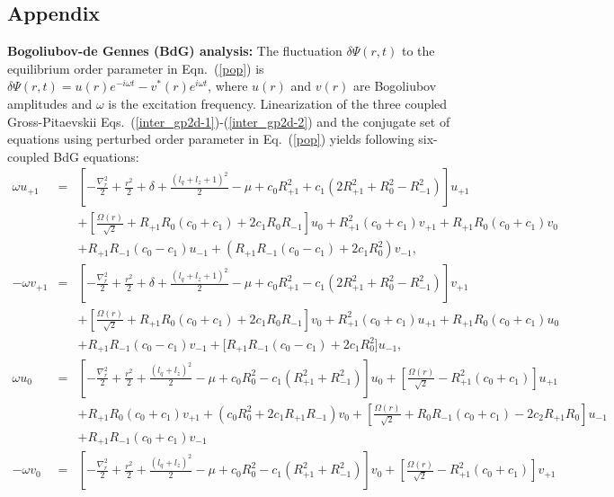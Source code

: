 \documentclass[pra,twocolumn,aps,superscriptaddress,showpacs,longbibliography]{revtex4-1}
\begin{document}
\begin{widetext}
\section*{Appendix}
{\bf Bogoliubov-de Gennes (BdG) analysis:}
The fluctuation $\delta {\Psi(r,t)}$ to the equilibrium order parameter in Eqn.~(\ref{pop}) is 
$\delta {\Psi}(r,t) = u(r) e^{-i\omega t}-v^*(r) e^{i\omega t}$, where $u(r)$ and $v(r)$ are
Bogoliubov amplitudes and $\omega$ is the excitation frequency. Linearization of the three coupled Gross-Pitaevskii 
Eqs.~(\ref{inter_gp2d-1})-(\ref{inter_gp2d-2}) and the conjugate set of equations using perturbed order parameter 
in Eq.~(\ref{pop}) yields following six-coupled BdG equations:
 \begin{subequations}
 \begin{eqnarray}
\omega u_{+1}   &=&
 \left[-\frac{\nabla^2_r}{2} +\frac{r^2}{2}+ \delta+ \frac{(l_q+l_z+1)^2}{2}-\mu +c_0 R_{+1}^2+  c_1(2R_{+1}^2+R_0^2-R_{-1}^2)\right]u_{+1} \nonumber \\
&&
 +\left[\frac{\Omega(r)}{\sqrt{2}}+R_{+1} R_0(c_0+c_1) +2 c_1 R_0 R_{-1}\right]u_0 + R_{+1}^2 (c_0+c_1)v_{+1} + R_{+1} R_0(c_0+c_1) v_0\nonumber \\
&& 
 + R_{+1} R_{-1}(c_0-c_1)u_{-1} +(R_{+1} R_{-1} (c_0-c_1)+2c_1R_0^2)v_{-1}, 
\label{bdg-1u}\\
-\omega v_{+1}   &=&
 \left[-\frac{\nabla^2_r}{2} +\frac{r^2}{2}+ \delta+ \frac{(l_q+l_z+1)^2}{2}-\mu +c_0 R_{+1}^2-  c_1(2R_{+1}^2+R_0^2-R_{-1}^2)\right]v_{+1}\nonumber\\ && + \left[\frac{\Omega(r)}{\sqrt{2}}+R_{+1} R_0(c_0+c_1)
 +2 c_1 R_0 R_{-1}\right]v_0 + R_{+1}^2 (c_0+c_1)u_{+1} + R_{+1} R_0(c_0+c_1) u_0
\nonumber\\ &&
+ R_{+1} R_{-1}(c_0-c_1)v_{-1} +\big[R_{+1} R_{-1} (c_0-c_1)+2c_1R_0^2 \big]u_{-1},
 \label{bdg-1v} \\
  \omega u_0   &=&
\left[-\frac{\nabla^2_r}{2} +\frac{r^2}{2}+  \frac{(l_q+l_z)^2}{2}-\mu +c_0R_0^2-c_1(R_{+1}^2+R_{-1}^2)\right]u_0 +\left[\frac{\Omega(r)}{\sqrt{2}} -R_{+1}^2(c_0+c_1)\right]u_{+1} \nonumber \\
  &&
  + R_{+1}R_0(c_0+c_1)v_{+1}+(c_0R_0^2+2c_1R_{+1}R_{-1})v_0+\left[\frac{\Omega(r)}{\sqrt{2}}+R_0R_{-1}(c_0+c_1) -2c_2R_{+1}R_0 \right]u_{-1}\nonumber \\
  &&
  + R_{+1}R_{-1}(c_0+c_1)v_{-1}\label{bdg-2u} \\
-\omega v_0  &=&
 \left[-\frac{\nabla^2_r}{2} +\frac{r^2}{2}+  \frac{(l_q+l_z)^2}{2}-\mu +c_0R_0^2-c_1(R_{+1}^2+R_{-1}^2)\right]v_{0} +\left[\frac{\Omega(r)}{\sqrt{2}} -R_{+1}^2(c_0+c_1)\right]v_{+1} \nonumber \\

\end{eqnarray}
\end{subequations}
\end{widetext}
\end{document}
